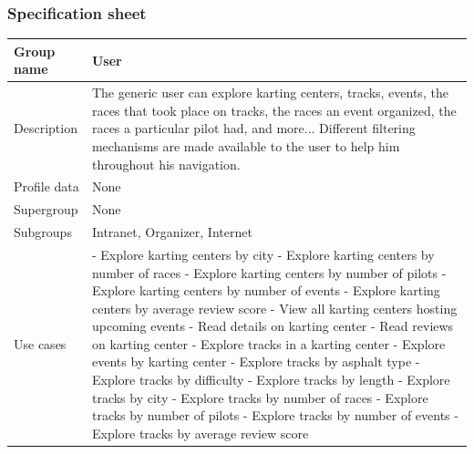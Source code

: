 \documentclass{beamer}
\begin{document}
\begin{frame}
    \frametitle{Specification sheet}
    \begin{table}
        \tiny
        \begin{tabular}{|p{2cm}|p{6cm}|}
        \hline
        Group name & \textbf{User} \\
        \hline
        Description & The generic user can explore karting centers, tracks, events, the races that
        took place on tracks, the races an event organized, the races a particular pilot had, and more...
        Different filtering mechanisms are made available to the user to help him throughout his navigation. \\
        \hline
        Profile data & None \\
        \hline
        Supergroup & None \\
        \hline
        Subgroups & Intranet, Organizer, Internet\\
        \hline
        Use cases &
        - Explore karting centers by city \newline
        - Explore karting centers by number of races \newline
        - Explore karting centers by number of pilots \newline
        - Explore karting centers by number of events \newline
        - Explore karting centers by average review score \newline
        - View all karting centers hosting upcoming events \newline
        - Read details on karting center \newline
        - Read reviews on karting center \newline
        - Explore tracks in a karting center \newline
        - Explore events by karting center \newline
        - Explore tracks by asphalt type \newline
        - Explore tracks by difficulty \newline
        - Explore tracks by length \newline
        - Explore tracks by city \newline
        - Explore tracks by number of races \newline
        - Explore tracks by number of pilots \newline
        - Explore tracks by number of events \newline
        - Explore tracks by average review score \\
        \hline
        \end{tabular}
    \end{table}
\end{frame}
\end{document}
